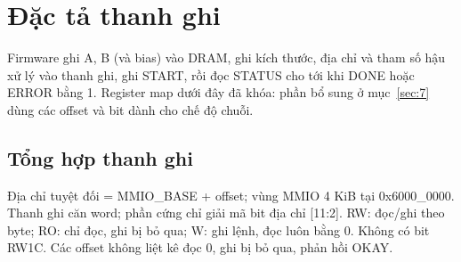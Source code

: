 \section{Đặc tả thanh ghi}\label{sec:3}


Firmware ghi A, B (và bias) vào DRAM, ghi kích thước, địa chỉ và tham số hậu xử lý vào thanh ghi, ghi START, rồi đọc STATUS cho tới khi DONE hoặc ERROR bằng 1. Register map dưới đây đã khóa: phần bổ sung ở mục~\ref{sec:7} dùng các offset và bit dành cho chế độ chuỗi.


\subsection{Tổng hợp thanh ghi}\label{sec:3.1}
Địa chỉ tuyệt đối = MMIO\_BASE + offset; vùng MMIO 4 KiB tại 0x6000\_0000. Thanh ghi căn word; phần cứng chỉ giải mã bit địa chỉ [11:2]. RW: đọc/ghi theo byte; RO: chỉ đọc, ghi bị bỏ qua; W: ghi lệnh, đọc luôn bằng 0. Không có bit RW1C. Các offset không liệt kê đọc 0, ghi bị bỏ qua, phản hồi OKAY.
